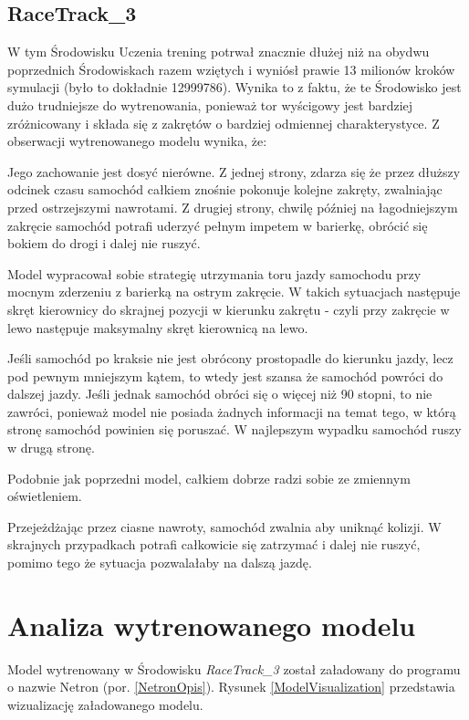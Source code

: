 \subsection{RaceTrack\_3}
W tym Środowisku Uczenia trening potrwał znacznie dłużej niż na obydwu poprzednich Środowiskach razem wziętych i wyniósł prawie 13 milionów kroków symulacji (było to dokładnie 12999786). Wynika to z faktu, że te Środowisko jest dużo trudniejsze do wytrenowania, ponieważ tor wyścigowy jest bardziej zróżnicowany i składa się z zakrętów o bardziej odmiennej charakterystyce. Z obserwacji wytrenowanego modelu wynika, że:
\begin{enumerate*}
\item Jego zachowanie jest dosyć nierówne. Z jednej strony, zdarza się że przez dłuższy odcinek czasu samochód całkiem znośnie pokonuje kolejne zakręty, zwalniając przed ostrzejszymi nawrotami. Z drugiej strony, chwilę później na łagodniejszym zakręcie samochód potrafi uderzyć pełnym impetem w barierkę, obrócić się bokiem do drogi i dalej nie ruszyć.
\item Model wypracował sobie strategię utrzymania toru jazdy samochodu przy mocnym zderzeniu z barierką na ostrym zakręcie. W takich sytuacjach następuje skręt kierownicy do skrajnej pozycji w kierunku zakrętu - czyli przy zakręcie w lewo następuje maksymalny skręt kierownicą na lewo.
\item Jeśli samochód po kraksie nie jest obrócony prostopadle do kierunku jazdy, lecz pod pewnym mniejszym kątem, to wtedy jest szansa że samochód powróci do dalszej jazdy. Jeśli jednak samochód obróci się o więcej niż 90 stopni, to nie zawróci, ponieważ model nie posiada żadnych informacji na temat tego, w którą stronę samochód powinien się poruszać. W najlepszym wypadku samochód ruszy w drugą stronę.
\item Podobnie jak poprzedni model, całkiem dobrze radzi sobie ze zmiennym oświetleniem.
\item Przejeżdżając przez ciasne nawroty, samochód zwalnia aby uniknąć kolizji. W skrajnych przypadkach potrafi całkowicie się zatrzymać i dalej nie ruszyć, pomimo tego że sytuacja pozwalałaby na dalszą jazdę.
\end{enumerate*}

\section{Analiza wytrenowanego modelu}
Model wytrenowany w Środowisku \textit{RaceTrack\_3} został załadowany do programu o nazwie Netron (por. \ref{NetronOpis}). Rysunek \ref{ModelVisualization} przedstawia wizualizację załadowanego modelu. \\

